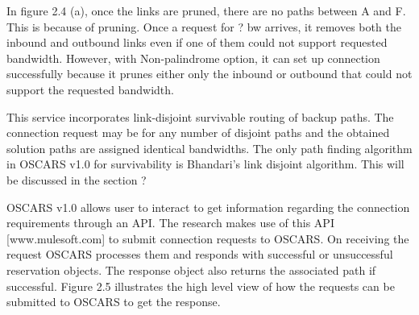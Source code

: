 In figure 2.4 (a), once the links are pruned, there are no paths between A and F. This is because of pruning. Once a request for ? bw arrives, it removes both the inbound and outbound links even if one of them could not support requested bandwidth. However, with Non-palindrome option, it can set up connection successfully because it prunes either only the inbound or outbound that could not support the requested bandwidth.  

This service incorporates link-disjoint survivable routing of backup paths. The connection request may be for any number of disjoint paths and the obtained solution paths are assigned identical bandwidths. The only path finding algorithm in OSCARS v1.0 for survivability is Bhandari's link disjoint algorithm. This will be discussed in the section ?

OSCARS v1.0 allows user to interact to get information regarding the connection requirements through an API. The research makes use of this API [www.mulesoft.com] to submit connection requests to OSCARS. On receiving the request OSCARS processes them and responds with successful or unsuccessful reservation objects. The response object also returns the associated path if successful. Figure 2.5 illustrates the high level view of how the requests can be submitted to OSCARS to get the response.

